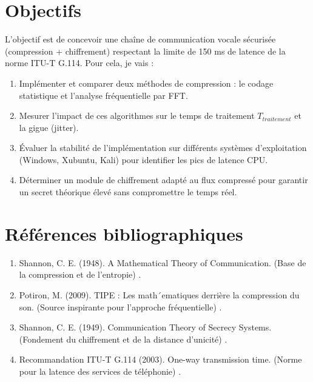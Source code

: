 \documentclass[11pt]{article}
\begin{document}
\section*{Objectifs}
L'objectif est de concevoir une chaîne de communication vocale sécurisée (compression + chiffrement) respectant la limite de 150 ms de latence de la norme ITU-T G.114. Pour cela, je vais :
\begin{enumerate}
    \item Implémenter et comparer deux méthodes de compression : le codage statistique et l'analyse fréquentielle par FFT.
    \item Mesurer l'impact de ces algorithmes sur le temps de traitement $T_{traitement}$ et la gigue (jitter).
    \item Évaluer la stabilité de l'implémentation sur différents systèmes d'exploitation (Windows, Xubuntu, Kali) pour identifier les pics de latence CPU.
    \item Déterminer un module de chiffrement adapté au flux compressé pour garantir un secret théorique élevé sans compromettre le temps réel.
\end{enumerate}

\section*{Références bibliographiques}
\begin{enumerate}
    \item Shannon, C. E. (1948). A Mathematical Theory of Communication. (Base de la compression et de l'entropie) .
    \item Potiron, M. (2009). TIPE : Les math´ematiques derrière la compression du son. (Source inspirante pour l'approche fréquentielle) .
    \item Shannon, C. E. (1949). Communication Theory of Secrecy Systems. (Fondement du chiffrement et de la distance d'unicité) .
    \item Recommandation ITU-T G.114 (2003). One-way transmission time. (Norme pour la latence des services de téléphonie) .
\end{enumerate}
\end{document}
